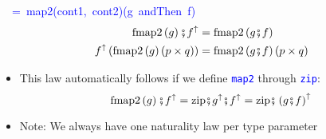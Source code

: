 \begin{itemize}
\begin{lyxcode}
\textcolor{blue}{\footnotesize{}~~=~map2(cont1,~cont2)(g~andThen~f)}{\footnotesize{}
\begin{align*}
\text{fmap}2\left(g\right)\bef f^{\uparrow} & =\text{fmap2}\left(g\bef f\right)\\
f^{\uparrow}\left(\text{fmap}2\left(g\right)\left(p\times q\right)\right) & =\text{fmap2}\left(g\bef f\right)\left(p\times q\right)
\end{align*}
}{\footnotesize\par}
\end{lyxcode}
\begin{itemize}
\item This law automatically follows if we define \texttt{\textcolor{blue}{\footnotesize{}map2}}
through \texttt{\textcolor{blue}{\footnotesize{}zip}}:{\footnotesize{}
\[
\text{fmap}2\left(g\right)\bef f^{\uparrow}=\text{zip}\bef g^{\uparrow}\bef f^{\uparrow}=\text{zip}\bef\left(g\bef f\right)^{\uparrow}
\]
}{\footnotesize\par}
\item Note: We always have one naturality law per type parameter
\end{itemize}
\end{itemize}


